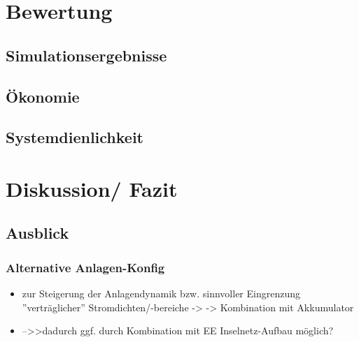 \documentclass[onecolumn,10pt,titlepage]{article}
\begin{document}
\section{Bewertung}
\subsection{Simulationsergebnisse}
\subsection{Ökonomie}
\subsection{Systemdienlichkeit}


\section{Diskussion/ Fazit}




\subsection{Ausblick}
\subsubsection{Alternative Anlagen-Konfig}
\begin{itemize}
	\item zur Steigerung der Anlagendynamik bzw. sinnvoller Eingrenzung ''verträglicher'' Stromdichten/-bereiche -> -> Kombination mit Akkumulator
	\item -->>dadurch ggf. durch Kombination mit EE Inselnetz-Aufbau möglich? 
\end{itemize}
\end{document}
